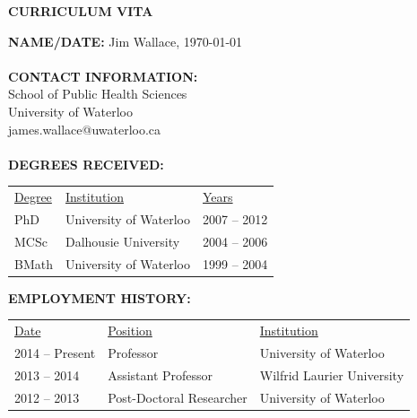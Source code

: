 \documentclass[12pt]{article}
\begin{document}
\noindent

\thispagestyle{empty}
\begin{center}
\textbf{CURRICULUM VITA}
\end{center}

\textbf{NAME/DATE:} Jim Wallace, \usvardate\today
\\ \\
\textbf{CONTACT INFORMATION:} \\
School of Public Health Sciences \\
University of Waterloo \\
james.wallace@uwaterloo.ca
\\ \\
\textbf{DEGREES RECEIVED:} 

\begin{table}[h!]
\centering
\begin{tabular}{p{2.5cm} p{5cm} p{5cm}}
\underline{Degree}              & \underline{Institution}              & \underline{Years} \\
PhD                 & University of Waterloo   & 2007 – 2012  \\
MCSc                & Dalhousie University     & 2004 – 2006  \\
BMath               & University of Waterloo   & 1999 – 2004  \\
\end{tabular}
\end{table}

\textbf{EMPLOYMENT HISTORY:}
\begin{table}[h!]
\centering
\begin{tabular}{p{3.5cm} l l}
\underline{Date}                & \underline{Position}                 & \underline{Institution} \\
2014 -- Present     & Professor                & University of Waterloo \\
2013 – 2014         & Assistant Professor      & Wilfrid Laurier University \\
2012 – 2013         & Post-Doctoral Researcher & University of Waterloo  \\
\end{tabular}
\end{table}
\end{document}
